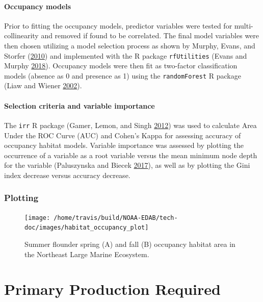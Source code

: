 \documentclass[
]{book}
\begin{document}
\hypertarget{occupancy-models}{%
\subsubsection{Occupancy models}\label{occupancy-models}}

Prior to fitting the occupancy models, predictor variables were tested for multi-collinearity and removed if found to be correlated. The final model variables were then chosen utilizing a model selection process as shown by Murphy, Evans, and Storfer (\protect\hyperlink{ref-Murphy2010}{2010}) and implemented with the R package \texttt{rfUtilities} (Evans and Murphy \protect\hyperlink{ref-rfUtilities-package}{2018}). Occupancy models were then fit as two-factor classification models (absence as 0 and presence as 1) using the \texttt{randomForest} R package (Liaw and Wiener \protect\hyperlink{ref-randomForest}{2002}).

\hypertarget{selection-criteria-and-variable-importance}{%
\subsubsection{Selection criteria and variable importance}\label{selection-criteria-and-variable-importance}}

The \texttt{irr} R package (Gamer, Lemon, and Singh \protect\hyperlink{ref-irr}{2012}) was used to calculate Area Under the ROC Curve (AUC) and Cohen's Kappa for assessing accuracy of occupancy habitat models. Variable importance was assessed by plotting the occurrence of a variable as a root variable versus the mean minimum node depth for the variable (Paluszynska and Biecek \protect\hyperlink{ref-randomForestExplainer}{2017}), as well as by plotting the Gini index decrease versus accuracy decrease.

\hypertarget{plotting-19}{%
\subsection{Plotting}\label{plotting-19}}

\begin{figure}[H]
\texttt{[image: /home/travis/build/NOAA-EDAB/tech-doc/images/habitat\_occupancy\_plot]} \caption{Summer flounder spring (A) and fall (B) occupancy habitat area in the Northeast Large Marine Ecosystem. }\label{fig:occupancy-MAB}
\end{figure}

\hypertarget{primary-production-required}{%
\chapter{Primary Production Required}\label{primary-production-required}}
\end{document}
